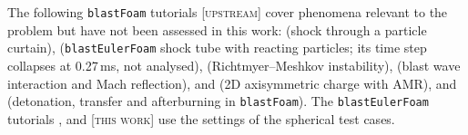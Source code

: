 \documentclass{article}
\newcommand{\up}{\textsc{[upstream]}}
\newcommand{\tw}{\textsc{[this work]}}
\begin{document}
The following \texttt{blastFoam} tutorials \up{} cover phenomena relevant to the problem but have not been assessed in this work:  (shock through a particle curtain),  (\texttt{blastEulerFoam} shock tube with reacting particles; its time step collapses at 0.27\,ms, not analysed),  (Richtmyer--Meshkov instability),  (blast wave interaction and Mach reflection),  and  (2D axisymmetric charge with AMR), and  (detonation, transfer and afterburning in \texttt{blastFoam}). The \texttt{blastEulerFoam} tutorials ,  and  \tw{} use the settings of the spherical test cases.
\end{document}
